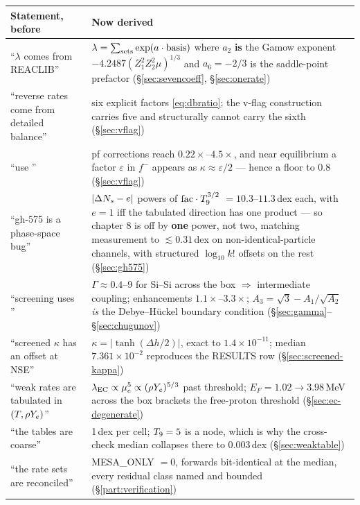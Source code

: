 \begin{center}
\begin{tabularx}{\textwidth}{@{}L{4.4cm} Y@{}}
\toprule
\textbf{Statement, before} & \textbf{Now derived} \\
\midrule
``$\lambda$ comes from REACLIB'' &
  $\lambda = \sum_{\rm sets}\exp(a\cdot\text{basis})$ where $a_2$ \textbf{is}
  the Gamow exponent $-4.2487(Z_1^2Z_2^2\mu)^{1/3}$ and $a_6 = -2/3$ is the
  saddle-point prefactor (\S\ref{sec:sevencoeff}, \S\ref{sec:onerate}) \\
``reverse rates come from detailed balance'' &
  six explicit factors \eqref{eq:dbratio}; the v-flag construction carries five
  and structurally cannot carry the sixth (\S\ref{sec:vflag}) \\
``use '' &
  pf corrections reach $0.22\times$--$4.5\times$, and near equilibrium a factor
  $\varepsilon$ in $f^-$ appears as $\kappa \approx \varepsilon/2$ --- hence a
  floor to 0.8 (\S\ref{sec:vflag}) \\
``gh-575 is a phase-space bug'' &
  $|\Delta N_{s} - e|$ powers of $\mathrm{fac}\cdot T_{9}^{3/2}$ $= 10.3$--$11.3$\,dex each, with
  $e = 1$ iff the tabulated direction has one product --- so chapter 8 is off by
  \textbf{one} power, not two, matching measurement to ${\lesssim}0.31$\,dex on
  non-identical-particle channels, with structured $\log_{10}k!$ offsets on the
  rest (\S\ref{sec:gh575}) \\
``screening uses '' &
  $\Gamma \approx 0.4$--9 for Si--Si across the box $\Rightarrow$ intermediate
  coupling; enhancements $1.1\times$--$3.3\times$;
  $A_3 = \sqrt3 - A_1/\sqrt{A_2}$ \emph{is} the Debye--H\"uckel boundary
  condition (\S\ref{sec:gamma}--\S\ref{sec:chugunov}) \\
``screened $\kappa$ has an offset at NSE'' &
  $\kappa = |\tanh(\Delta h/2)|$, exact to $1.4\times10^{-11}$; median
  $7.361\times10^{-2}$ reproduces the RESULTS row
  (\S\ref{sec:screened-kappa}) \\
``weak rates are tabulated in $(T, \rho Y_{e})$'' &
  $\lambda_{\rm EC} \propto \mu_{e}^5 \propto (\rho Y_{e})^{5/3}$ past threshold;
  $E_F = 1.02 \to 3.98$\,MeV across the box brackets the free-proton threshold
  (\S\ref{sec:ec-degenerate}) \\
``the tables are coarse'' &
  1\,dex per \rhoye{} cell; $T_{9} = 5$ is a node, which is why the cross-check
  median collapses there to 0.003\,dex (\S\ref{sec:weaktable}) \\
``the rate sets are reconciled'' &
  MESA\_ONLY $= 0$, forwards bit-identical at the median, every residual class
  named and bounded (\S\ref{part:verification}) \\
\bottomrule
\end{tabularx}
\end{center}

